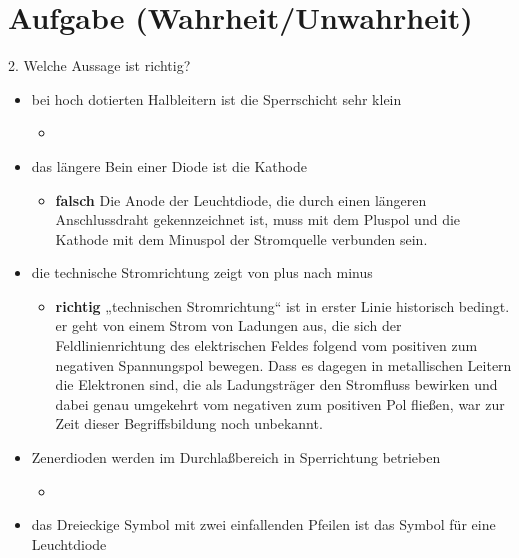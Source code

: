 \section{Aufgabe (Wahrheit/Unwahrheit)}%
\label{sec:aufgabe_1}

2. Welche Aussage ist richtig?

\begin{itemize}
    \item bei hoch dotierten Halbleitern ist die Sperrschicht sehr klein
        \begin{itemize}
            \item 
        \end{itemize}
    \item das längere Bein einer Diode ist die Kathode 
        \begin{itemize}
            \item \textbf{falsch} Die Anode der Leuchtdiode,
                die durch einen längeren Anschlussdraht gekennzeichnet ist, 
                muss mit dem Pluspol 
                und die Kathode mit dem Minuspol der Stromquelle 
                verbunden sein. 
        \end{itemize}
    \item die technische Stromrichtung zeigt von plus nach minus
        \begin{itemize}
            \item \textbf{richtig} „technischen Stromrichtung“ ist in erster 
                Linie historisch bedingt. 
                er geht von einem Strom von Ladungen aus, 
                die sich der Feldlinienrichtung des elektrischen Feldes folgend
                vom positiven zum negativen Spannungspol bewegen. 
                Dass es dagegen in metallischen Leitern die Elektronen sind, 
                die als Ladungsträger den Stromfluss bewirken 
                und dabei genau umgekehrt vom negativen zum positiven Pol 
                fließen, war zur Zeit dieser Begriffsbildung noch unbekannt.
        \end{itemize}
    \item Zenerdioden werden im Durchlaßbereich in Sperrichtung betrieben
        \begin{itemize}
            \item 
        \end{itemize}
    \item das Dreieckige Symbol mit zwei einfallenden Pfeilen ist das Symbol für
        eine Leuchtdiode
        \begin{itemize}

\end{itemize}
\end{itemize}
